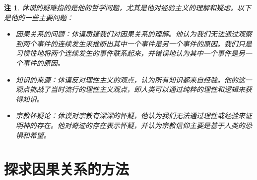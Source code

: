 \documentclass[12pt,onecolumn,a4paper]{book}
\newtheorem*{note}{注}
\numberwithin{table}{subsection}
\numberwithin{equation}{subsection}
\begin{document}
\begin{note}
    休谟的疑难指的是他的哲学问题，尤其是他对经验主义的理解和疑虑。以下是他的一些主要问题：

    \begin{itemize}[itemsep=0pt,parsep=0pt]
        \item 因果关系的问题：休谟质疑我们对因果关系的理解。他认为我们无法通过观察到两个事件的连续发生来推断出其中一个事件是另一个事件的原因。我们只是习惯性地将两个连续发生的事件联系起来，并错误地认为其中一个事件是另一个事件的原因。
        \item 知识的来源：休谟反对理性主义的观点，认为所有知识都来自经验。他的这一观点挑战了当时流行的理性主义观点，即人类可以通过纯粹的理性和逻辑来获得知识。
        \item 宗教怀疑论：休谟对宗教有深深的怀疑，他认为我们无法通过理性或经验来证明神的存在。他对奇迹的存在表示怀疑，并认为宗教信仰主要是基于人类的恐惧和希望。
    \end{itemize}
\end{note}

\section{探求因果关系的方法}
\end{document}
